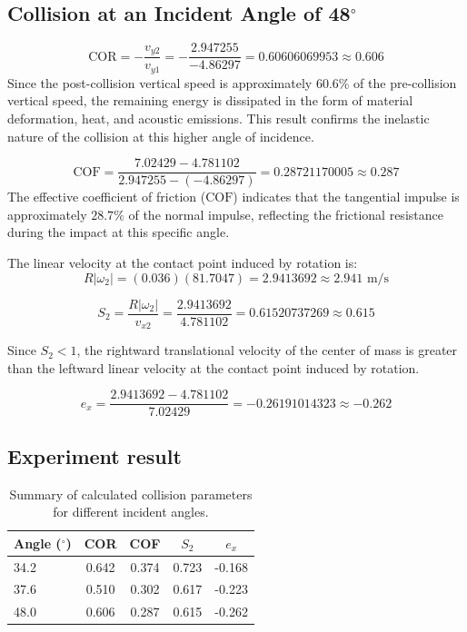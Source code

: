 \documentclass[11pt,letterpaper]{article}
\begin{document}
\subsection{Collision at an Incident Angle of 48$^\circ$}
$$ \text{COR} = -\frac{v_{y2}}{v_{y1}} = -\frac{2.947255}{-4.86297} = 0.60606069953 \approx 0.606 $$
Since the post-collision vertical speed is approximately 60.6\% of the pre-collision vertical speed, the remaining energy is dissipated in the form of material deformation, heat, and acoustic emissions. This result confirms the inelastic nature of the collision at this higher angle of incidence.

$$ \text{COF} = \frac{7.02429 - 4.781102}{2.947255 - (-4.86297)} = 0.28721170005 \approx 0.287 $$
The effective coefficient of friction ($\text{COF}$) indicates that the tangential impulse is approximately $28.7\%$ of the normal impulse, reflecting the frictional resistance during the impact at this specific angle.

\noindent The linear velocity at the contact point induced by rotation is:
$$ R|\omega_2| = (0.036)(81.7047) = 2.9413692 \approx 2.941 \text{ m/s} $$

\vspace{1em}
$$ S_2 = \frac{R|\omega_2|}{v_{x2}} = \frac{2.9413692}{4.781102} = 0.61520737269 \approx 0.615 $$

\vspace{1em}
\noindent Since $S_2 < 1$, the rightward translational velocity of the center of mass is greater than the leftward linear velocity at the contact point induced by rotation.

$$ e_x = \frac{2.9413692 - 4.781102}{7.02429} = -0.26191014323 \approx -0.262 $$

\subsection{Experiment result}
\begin{table}[h!]
\centering
\caption{Summary of calculated collision parameters for different incident angles.}
\label{tab:experiment_results_summary}
\begin{tabular}{lcccc}
\toprule
\textbf{Angle ($^\circ$)} & \textbf{COR} & \textbf{COF} & \textbf{$S_2$} & \textbf{$e_x$} \\
\midrule
34.2 & 0.642 & 0.374 & 0.723 & -0.168 \\
37.6 & 0.510 & 0.302 & 0.617 & -0.223 \\
48.0 & 0.606 & 0.287 & 0.615 & -0.262 \\
\bottomrule
\end{tabular}
\end{table}
\end{document}
